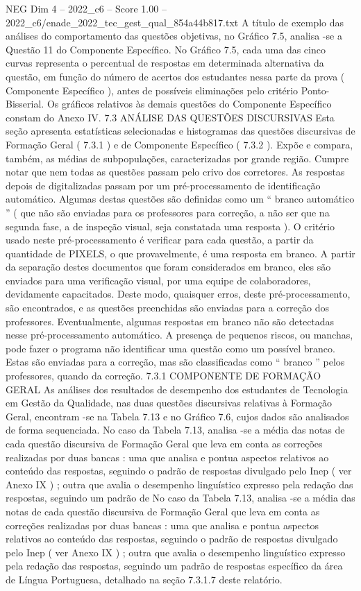 \begin{textsample}{NEG Dim 4 – 2022\_c6 – Score 1.00 – 2022\_c6/enade\_2022\_tec\_gest\_qual\_854a44b817.txt}
A título de exemplo das análises do comportamento das questões objetivas, no Gráfico 7.5, analisa -se a Questão 11 do Componente Específico.
No Gráfico 7.5, cada uma das cinco curvas representa o percentual de respostas em determinada alternativa da questão, em função do número de acertos dos estudantes nessa parte da prova ( Componente Específico ), antes de possíveis eliminações pelo critério Ponto-Bisserial.
Os gráficos relativos às demais questões do Componente Específico constam do Anexo IV. 7.3 ANÁLISE DAS QUESTÕES DISCURSIVAS Esta seção apresenta estatísticas selecionadas e histogramas das questões discursivas de Formação Geral ( 7.3.1 ) e de Componente Específico ( 7.3.2 ).
Expõe e compara, também, as médias de subpopulações, caracterizadas por grande região.
Cumpre notar que nem todas as questões passam pelo crivo dos corretores.
As respostas depois de digitalizadas passam por um pré-processamento de identificação automático.
Algumas destas questões são definidas como um “ branco automático ” ( que não são enviadas para os professores para correção, a não ser que na segunda fase, a de inspeção visual, seja constatada uma resposta ).
O critério usado neste pré-processamento é verificar para cada questão, a partir da quantidade de PIXELS, o que provavelmente, é uma resposta em branco.
A partir da separação destes documentos que foram considerados em branco, eles são enviados para uma verificação visual, por uma equipe de colaboradores, devidamente capacitados.
Deste modo, quaisquer erros, deste pré-processamento, são encontrados, e as questões preenchidas são enviadas para a correção dos professores.
Eventualmente, algumas respostas em branco não são detectadas nesse pré-processamento automático.
A presença de pequenos riscos, ou manchas, pode fazer o programa não identificar uma questão como um possível branco.
Estas são enviadas para a correção, mas são classificadas como “ branco ” pelos professores, quando da correção. 7.3.1 COMPONENTE DE FORMAÇÃO GERAL As análises dos resultados de desempenho dos estudantes de Tecnologia em Gestão da Qualidade, nas duas questões discursivas relativas à Formação Geral, encontram -se na Tabela 7.13 e no Gráfico 7.6, cujos dados são analisados de forma sequenciada.
No caso da Tabela 7.13, analisa -se a média das notas de cada questão discursiva de Formação Geral que leva em conta as correções realizadas por duas bancas : uma que analisa e pontua aspectos relativos ao conteúdo das respostas, seguindo o padrão de respostas divulgado pelo Inep ( ver Anexo IX ) ; outra que avalia o desempenho linguístico expresso pela redação das respostas, seguindo um padrão de No caso da Tabela 7.13, analisa -se a média das notas de cada questão discursiva de Formação Geral que leva em conta as correções realizadas por duas bancas : uma que analisa e pontua aspectos relativos ao conteúdo das respostas, seguindo o padrão de respostas divulgado pelo Inep ( ver Anexo IX ) ; outra que avalia o desempenho linguístico expresso pela redação das respostas, seguindo um padrão de respostas específico da área de Língua Portuguesa, detalhado na seção 7.3.1.7 deste relatório.

\end{textsample}
